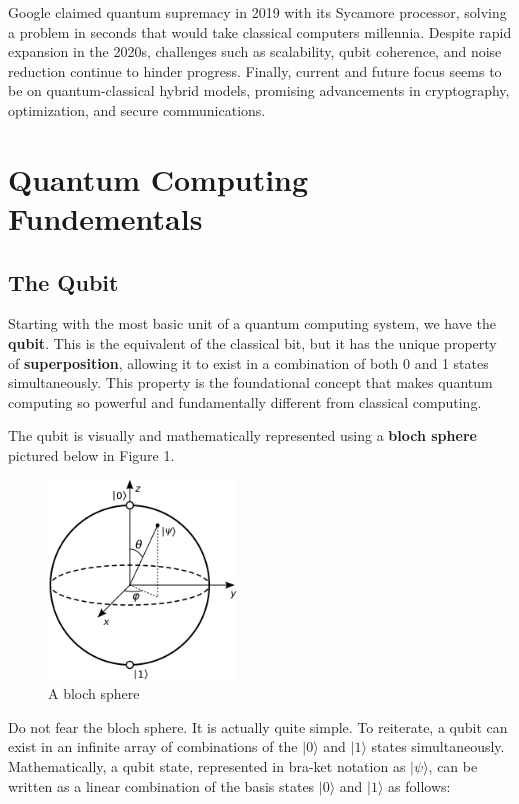 Google claimed quantum supremacy in 2019 with its Sycamore processor, solving a problem in seconds that would take classical computers millennia. Despite rapid expansion in the 2020s, challenges such as scalability, qubit coherence, and noise reduction continue to hinder progress. Finally, current and future focus seems to be on quantum-classical hybrid models, promising advancements in cryptography, optimization, and secure communications.

\section{Quantum Computing Fundementals}

\subsection{The Qubit}

Starting with the most basic unit of a quantum computing system, we have the \textbf{qubit}. This is the equivalent of the classical bit, but it has the unique property of \textbf{superposition}, allowing it to exist in a combination of both 0 and 1 states simultaneously. This property is the foundational concept that makes quantum computing so powerful and fundamentally different from classical computing. \newline

The qubit is visually and mathematically represented using a \textbf{bloch sphere} pictured below in Figure 1. 

\begin{figure}[ht]
\centering
\includegraphics[width=5cm]{images/Bloch_sphere.svg.png}
\caption{A bloch sphere}
\end{figure}

Do not fear the bloch sphere. It is actually quite simple. To reiterate, a qubit can exist in an infinite array of combinations of the $|0\rangle$ and $|1\rangle$ states simultaneously\cite{refrence4}. Mathematically, a qubit state, represented in bra-ket notation as $|\psi\rangle$, can be written as a linear combination of the basis states $|0\rangle$ and $|1\rangle$ as follows:
 
